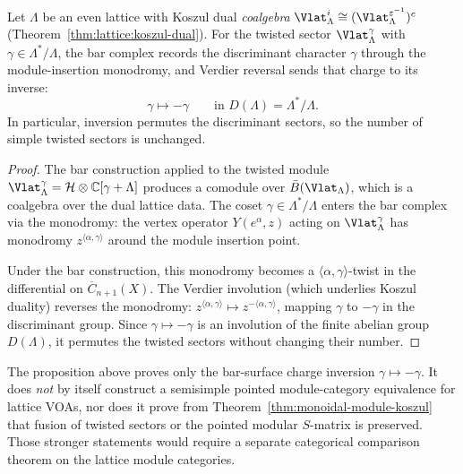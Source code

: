 \begin{proposition}
\label{prop:lattice-module-koszul}
Let $\Lambda$ be an even lattice with Koszul dual
\emph{coalgebra}
$\Vlat_\Lambda^i \cong (\Vlat_\Lambda^{\varepsilon^{-1}})^c$
\textup{(}Theorem~\textup{\ref{thm:lattice:koszul-dual})}. For the
twisted sector $\Vlat_\Lambda^\gamma$ with
$\gamma \in \Lambda^*/\Lambda$, the bar complex records the
discriminant character $\gamma$ through the module-insertion
monodromy, and Verdier reversal sends that charge to its inverse:
\begin{equation}\label{eq:lattice-module-koszul}
\gamma \longmapsto -\gamma
\qquad\text{in } D(\Lambda)=\Lambda^*/\Lambda.
\end{equation}
In particular, inversion permutes the discriminant sectors, so the
number of simple twisted sectors is unchanged.
\end{proposition}

\begin{proof}
The bar construction applied to the twisted module
$\Vlat_\Lambda^\gamma = \mathcal{H} \otimes \mathbb{C}[\gamma + \Lambda]$
produces a comodule over $\bar{B}(\Vlat_\Lambda)$, which is a
coalgebra over the dual lattice data. The
coset $\gamma \in \Lambda^*/\Lambda$ enters the bar complex via
the monodromy: the vertex operator $Y(e^\alpha, z)$ acting on
$\Vlat_\Lambda^\gamma$ has monodromy $z^{\langle\alpha,\gamma\rangle}$
around the module insertion point.

Under the bar construction, this monodromy becomes a
$\langle\alpha,\gamma\rangle$-twist in the differential on
$\overline{C}_{n+1}(X)$. The Verdier involution (which underlies
Koszul duality) reverses the monodromy:
$z^{\langle\alpha,\gamma\rangle} \mapsto
z^{-\langle\alpha,\gamma\rangle}$,
mapping $\gamma$ to $-\gamma$ in the discriminant group.
Since $\gamma \mapsto -\gamma$ is an involution of the finite abelian
group $D(\Lambda)$, it permutes the twisted sectors without changing
their number.
\end{proof}

\begin{remark}
\label{rem:lattice-module-koszul-scope}
The proposition above proves only the bar-surface charge inversion
$\gamma \mapsto -\gamma$. It does \emph{not} by itself construct a
semisimple pointed module-category equivalence for lattice VOAs, nor
does it prove from Theorem~\ref{thm:monoidal-module-koszul} that
fusion of twisted sectors or the pointed modular $S$-matrix is preserved.
Those stronger statements would require a separate categorical
comparison theorem on the lattice module categories.
\end{remark}

